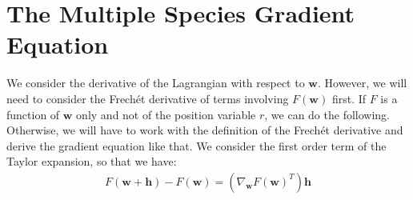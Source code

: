 \documentclass[11pt, a4paper]{article}
\theoremstyle{definition}
\newcommand{\w}{\mathbf{w}}
\newcommand{\h}{\mathbf{h}}
\begin{document}
	
	
\section{The Multiple Species Gradient Equation}
We consider the derivative of the Lagrangian with respect to $\w$. However, we will need to consider the Frech\'et derivative of terms involving $F(\w)$ first. If $F$ is a function of $\w$ only and not of the position variable $r$, we can do the following. Otherwise, we will have to work with the definition of the Frech\'et derivative and derive the gradient equation like that.
We consider the first order term of the Taylor expansion, so that we have:
\begin{align*}
F(\w + \h) - F(\w) =  \left(\nabla_{\w} F(\w)^T\right) \h 
\end{align*}
\end{document}

